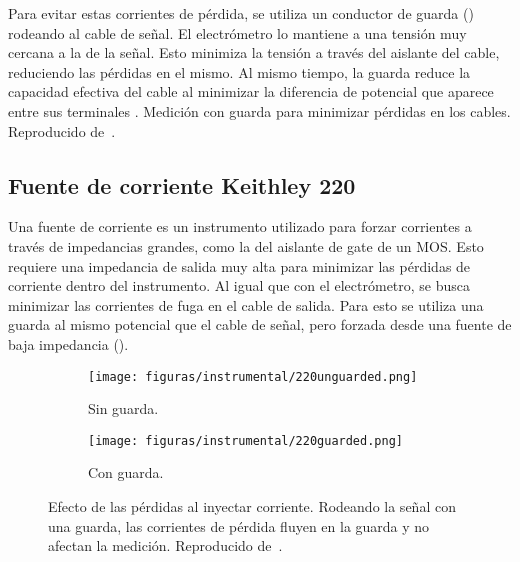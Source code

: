 Para evitar estas corrientes de pérdida,
se utiliza un conductor de guarda ()
rodeando al cable de señal.
El electrómetro lo mantiene a una tensión muy cercana a la de la señal.
Esto minimiza la tensión a través del aislante del cable,
reduciendo las pérdidas en el mismo.
Al mismo tiempo, la guarda reduce la capacidad efectiva del cable
al minimizar la diferencia de potencial que aparece entre sus terminales
\cite{rich_shielding_1983}.
{Medición con guarda para minimizar pérdidas en los cables.
    Reproducido de~\cite{keithley_instruments_inc._keithley_1984}.}
\subsection{Fuente de corriente Keithley 220}
Una fuente de corriente es un instrumento utilizado para forzar corrientes a
través de impedancias grandes,
como la del aislante de gate de un MOS.
Esto requiere una impedancia de salida muy alta para minimizar las pérdidas de
corriente dentro del instrumento.
Al igual que con el electrómetro,
se busca minimizar las corrientes de fuga en el cable de salida.
Para esto se utiliza una guarda al mismo potencial que el cable de señal,
pero forzada desde una fuente de baja impedancia ().
\begin{figure}[H]
    \begin{subfigure}[b]{\textwidth}
    \centering
        \texttt{[image: figuras/instrumental/220unguarded.png]}
        \caption{Sin guarda.}
    \end{subfigure}
    \begin{subfigure}[b]{\textwidth}
    \centering
        \texttt{[image: figuras/instrumental/220guarded.png]}
        \caption{Con guarda.}
    \end{subfigure}
        \caption{Efecto de las pérdidas al inyectar corriente.
        Rodeando la señal con una guarda, las corrientes de pérdida fluyen en
        la guarda y no afectan la medición.
    Reproducido de~\cite{keithley_instruments_inc._keithley_1984}.}
    \label{fig:220guard}
\end{figure}
